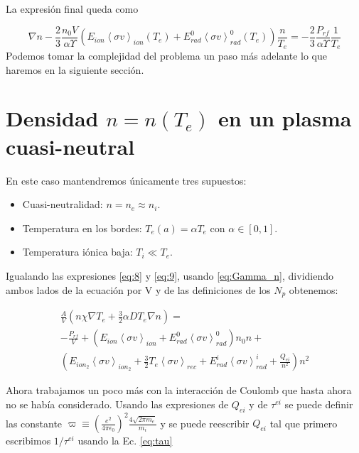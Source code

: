 \documentclass[11pt]{article}
\theoremstyle{definition}
\begin{document}
  La expresi\'on final queda como 

  \begin{equation}
    \nabla n - \frac{2}{3}\frac{n_0 V}{\alpha \varUpsilon}\left(  E_{ion}\left<\sigma v\right>_{ion}(T_e) + E_{rad}^0\left<\sigma v\right>_{rad}^0(T_e)\right)\frac{n}{T_e} = - \frac{2}{3}\frac{P_{rf}}{\alpha \varUpsilon}\frac{1}{T_e}
  \end{equation}
  Podemos tomar la complejidad del problema un paso m\'as adelante lo que haremos en la siguiente secci\'on.

  \section{Densidad $n = n(T_e)$ en un plasma cuasi-neutral}

  En este caso mantendremos \'unicamente tres supuestos:

  \begin{itemize}
    \item Cuasi-neutralidad: $n = n_e \approx n_i$.
    \item Temperatura en los bordes: $T_e(a) = \alpha T_e$ con $\alpha \in [0,1]$.
    \item Temperatura i\'onica baja: $T_i \ll T_e$.
  \end{itemize}

  Igualando las expresiones \eqref{eq:8} y \eqref{eq:9}, usando \eqref{eq:Gamma_n}, dividiendo ambos lados de la ecuaci\'on por V y de las definiciones de los $N_p$ obtenemos:

  \begin{eqnarray*}
  \frac{A}{V}(n\chi\nabla T_e + \frac{3}{2}\alpha D T_e \nabla n) = \\
  -\frac{P_{rf}}{V} + (E_{ion}\left<\sigma v\right>_{ion} + E_{rad}^0\left<\sigma v\right>_{rad}^0)n_0 n + \\ \left(E_{ion_2}\left<\sigma v\right>_{ion_2} + \frac{3}{2}T_e\left<\sigma v\right>_{rec} + E_{rad}^i\left<\sigma v\right>_{rad}^i + \frac{Q_{ei}}{n^2}\right)n^2
\end{eqnarray*}

Ahora trabajamos un poco m\'as con la interacci\'on de Coulomb que hasta ahora no se hab\'ia considerado. Usando las expresiones de $Q_{ei}$ y de $\tau^{ei}$ se puede definir las constante $\varpi \equiv \left(\frac{e^2}{4\pi\epsilon_0}\right)^2\frac{4\sqrt{2\pi m_e}}{m_i}$ y se puede reescribir $Q_{ei}$ tal que primero escribimos $1 / \tau^{ei}$ usando la Ec. \eqref{eq:tau}
\end{document}
